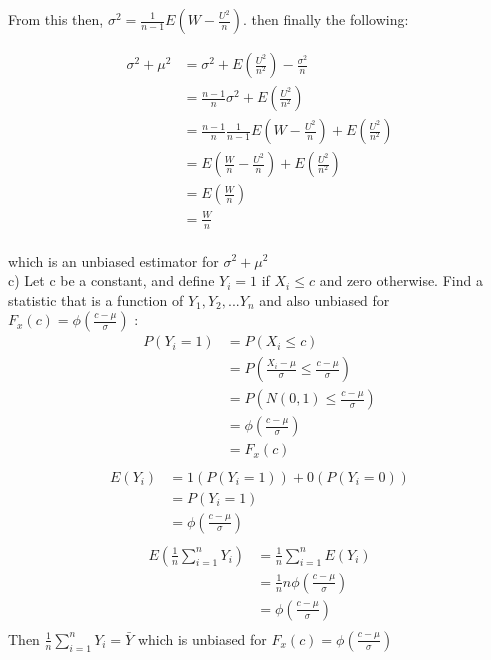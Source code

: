 From this then, $\sigma^{2}  = \frac{1}{n-1}E(W-\frac{U^{2}}{n})$. then finally the following:

\begin{align*}
	\sigma^{2}+\mu^{2} & = \sigma^{2}+E(\frac{U^{2}}{n^{2}})-\frac{\sigma^{2}}{n} \\ 
	& = \frac{n-1}{n}\sigma^{2}+E(\frac{U^{2}}{n^{2}}) \\
	& = \frac{n-1}{n}\frac{1}{n-1}E(W-\frac{U^{2}}{n})+E(\frac{U^{2}}{n^{2}}) \\
	& = E(\frac{W}{n}-\frac{U^{2}}{n})+E(\frac{U^{2}}{n^{2}}) \\ 
	& = E(\frac{W}{n}) \\
	& = \frac{W}{n} \\
\end{align*}

which is an unbiased estimator for $ \sigma^{2}+\mu^{2} $ \\


c) Let c be a constant, and define $Y_{i}=1 $ if $ X_{i}\leq c $ and zero otherwise. Find a statistic that is a
function of $Y_{1}, Y_{2}, ... Y_{n}$ and also unbiased for $F_{x}(c)=\phi(\frac{c-\mu}{\sigma}) $ : \\
\begin{align*}
	P(Y_{i}=1) & = P(X_{i}\leq c) \\
	& = P(\frac{X_{i}-\mu}{\sigma} \leq \frac{c-\mu}{\sigma}) \\
	& = P(N(0,1) \leq \frac{c-\mu}{\sigma}) \\
	& = \phi(\frac{c-\mu}{\sigma}) \\
	& = F_{x}(c)  \\
\end{align*}
\begin{align*}
	E(Y_{i}) & = 1(P(Y_{i}=1)) + 0(P(Y_{i}=0)) \\
	& = P(Y_{i}=1) \\
	& = \phi(\frac{c-\mu}{\sigma}) \\
\end{align*}
\begin{align*}
	E(\frac{1}{n}\sum\limits_{i=1}^n Y_{i}) & = \frac{1}{n}\sum\limits_{i=1}^n E(Y_{i}) \\ 
	& = \frac{1}{n} n\phi(\frac{c-\mu}{\sigma}) \\ 
	& = \phi(\frac{c-\mu}{\sigma}) \\
\end{align*}
Then $\frac{1}{n}\sum\limits_{i=1}^n Y_{i} = \bar{Y}$  
which is unbiased for $ F_{x}(c) = \phi(\frac{c-\mu}{\sigma})$ \\


